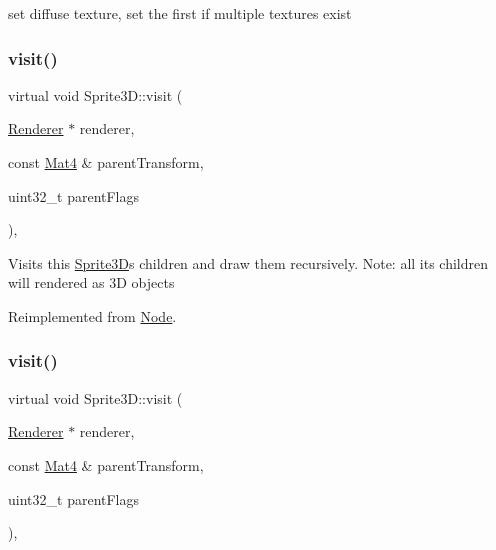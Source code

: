 set diffuse texture, set the first if multiple textures exist \mbox{\label{classSprite3D_a7c6db1d1a851a0a1d2ca17f4c9ad8c67}} 
\subsubsection{\texorpdfstring{visit()}{visit()}\hspace{0.1cm}{\footnotesize\ttfamily [1/2]}}
{\footnotesize\ttfamily virtual void Sprite3\+D\+::visit (\begin{DoxyParamCaption}\item[{\hyperlink{classRenderer}{Renderer} $\ast$}]{renderer,  }\item[{const \hyperlink{classMat4}{Mat4} \&}]{parent\+Transform,  }\item[{uint32\+\_\+t}]{parent\+Flags }\end{DoxyParamCaption})\hspace{0.3cm}{\ttfamily [override]}, {\ttfamily [virtual]}}

Visits this \hyperlink{classSprite3D}{Sprite3D}\textquotesingle{}s children and draw them recursively. Note\+: all its children will rendered as 3D objects 

Reimplemented from \hyperlink{classNode_a7d794a5e30745611ec33881a625edf26}{Node}.

\mbox{\label{classSprite3D_a7c6db1d1a851a0a1d2ca17f4c9ad8c67}} 
\subsubsection{\texorpdfstring{visit()}{visit()}\hspace{0.1cm}{\footnotesize\ttfamily [2/2]}}
{\footnotesize\ttfamily virtual void Sprite3\+D\+::visit (\begin{DoxyParamCaption}\item[{\hyperlink{classRenderer}{Renderer} $\ast$}]{renderer,  }\item[{const \hyperlink{classMat4}{Mat4} \&}]{parent\+Transform,  }\item[{uint32\+\_\+t}]{parent\+Flags }\end{DoxyParamCaption})\hspace{0.3cm}{\ttfamily [override]}, {\ttfamily [virtual]}}

